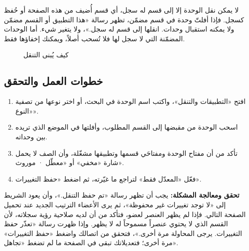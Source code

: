 \begin{rcwarn}
لا يمكن نقل الوحدة إلا إلى قسم له سجل، أي قسم أُضيف من هذه الصفحة أو حُفظ كسجل. فإذا أفلتّ وحدة في قسم مضمّن، تظهر رسالة «هذا التطبيق أو القسم مضمّن ولا يمكنه استقبال وحدات. انقلها إلى قسم له سجل.»، ولا يتغير شيء. أما الوحدات المضمّنة التي لا سجل لها فلا تُسحب أصلاً، ويمكنك إخفاؤها فقط.
\end{rcwarn}

\begin{figure}[H]
\centering
{}
\rclegend
\caption{كيف يُبنى التنقل}
\label{fig:builder-navigation-tree}
\end{figure}

\subsection{خطوات العمل والتحقق}
\begin{enumerate}
\item افتح «التطبيقات والتنقل»، واكتب اسم الوحدة في البحث، أو اختر نوعها من تصفية «النوع».
\item اسحب الوحدة من مقبضها إلى القسم المطلوب، وأفلتها في الموضع الذي تريده بين وحداته.
\item تأكد من أن مفتاح الوحدة ومفتاحَي قسمها وتطبيقها مشغّلة، وأن الصف لا يحمل شارة «مخفي» أو «معطّل · موروث».
\item فعّل «المعدّل فقط» لتراجع ما غيّرته، ثم اضغط «حفظ التغييرات».
\end{enumerate}

\textbf{تحقق ومعالجة المشكلة:} يجب أن تظهر رسالة «تم حفظ التنقل.»، وأن يعود الشريط إلى «لا توجد تغييرات غير محفوظة»، ثم يرى الأعضاء الترتيب الجديد عند تحميل الصفحة التالي. فإذا لم يظهر العنصر لعضو، فتأكد من أن لديه صلاحية رؤية سجلاته، لأن القسم الذي لا يحتوي عنصراً مسموحاً له لا يظهر. وإذا ظهرت رسالة «تعذّر حفظ التغييرات. يرجى المحاولة مرة أخرى.»، فتحقق من اتصالك واضغط «حفظ التغييرات» مرة أخرى؛ فتعديلاتك تبقى في الصفحة ما لم تضغط «تجاهل».


